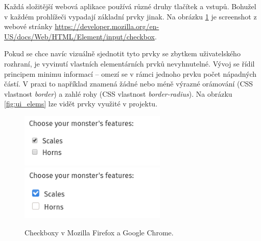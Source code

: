 \noindent
Každá složitější webová aplikace používá různé druhy tlačítek a vstupů.
Bohužel v každém prohlížeči vypadají základní prvky jinak. Na obrázku \ref{fig:browser_checkboxes}
je screenshot z webové stránky \url{https://developer.mozilla.org/en-US/docs/Web/HTML/Element/input/checkbox}.

Pokud se chce navíc vizuálně sjednotit tyto prvky se zbytkem uživatelského rozhraní, je
vyvinutí vlastních elementárních prvků nevyhnutelné. Vývoj se řídil principem minimu informací
-- omezí se v rámci jednoho prvku počet nápadných částí. V praxi to například znamená žádné nebo méně výrazné
 orámování (CSS vlastnost \textit{border}) a zahlé rohy (CSS vlastnost \textit{border-radius}).
Na obrázku \ref{fig:ui_elems} lze vidět prvky využité v projektu.

\begin{figure}[!htb] \centering
  \includegraphics[width=70mm]{../img/chrome_checkbox.png}
  \includegraphics[width=70mm]{../img/firefox_checkbox.png}
  \caption{Checkboxy v Mozilla Firefox a Google Chrome.}
  \label{fig:browser_checkboxes}
\end{figure}

